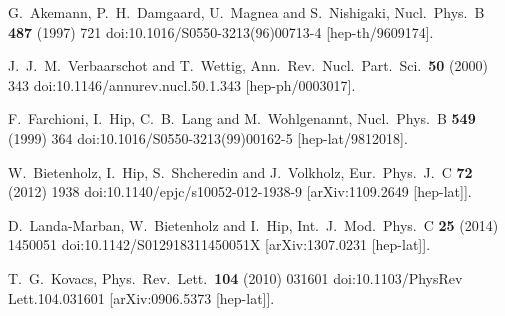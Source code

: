 \documentclass[12pt,a4paper]{article}
\begin{document}
\begin{thebibliography}{9}

  G.~Akemann, P.~H.~Damgaard, U.~Magnea and S.~Nishigaki,
  Nucl.\ Phys.\ B {\bf 487} (1997) 721
  doi:10.1016/S0550-3213(96)00713-4
  [hep-th/9609174].

  J.~J.~M.~Verbaarschot and T.~Wettig,
  Ann.\ Rev.\ Nucl.\ Part.\ Sci.\  {\bf 50} (2000) 343
  doi:10.1146/annurev.nucl.50.1.343
  [hep-ph/0003017].
  
  F.~Farchioni, I.~Hip, C.~B.~Lang and M.~Wohlgenannt,
  Nucl.\ Phys.\ B {\bf 549} (1999) 364
  doi:10.1016/S0550-3213(99)00162-5
  [hep-lat/9812018].

  W.~Bietenholz, I.~Hip, S.~Shcheredin and J.~Volkholz,
  Eur.\ Phys.\ J.\ C {\bf 72} (2012) 1938
  doi:10.1140/epjc/s10052-012-1938-9
  [arXiv:1109.2649 [hep-lat]].

  D.~Landa-Marban, W.~Bietenholz and I.~Hip,
  Int.\ J.\ Mod.\ Phys.\ C {\bf 25} (2014) 1450051
  doi:10.1142/S012918311450051X
  [arXiv:1307.0231 [hep-lat]].
  
  T.~G.~Kovacs,
  Phys.\ Rev.\ Lett.\  {\bf 104} (2010) 031601
  doi:10.1103/PhysRev Lett.104.031601
  [arXiv:0906.5373 [hep-lat]].


\end{thebibliography}
\end{document}
